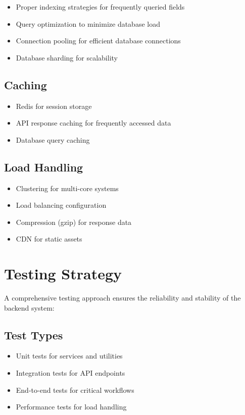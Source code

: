 \begin{itemize}
    \item Proper indexing strategies for frequently queried fields
    \item Query optimization to minimize database load
    \item Connection pooling for efficient database connections
    \item Database sharding for scalability
\end{itemize}

\subsection{Caching}

\begin{itemize}
    \item Redis for session storage
    \item API response caching for frequently accessed data
    \item Database query caching
\end{itemize}

\subsection{Load Handling}

\begin{itemize}
    \item Clustering for multi-core systems
    \item Load balancing configuration
    \item Compression (gzip) for response data
    \item CDN for static assets
\end{itemize}

\section{Testing Strategy}

A comprehensive testing approach ensures the reliability and stability of the backend system:

\subsection{Test Types}

\begin{itemize}
    \item Unit tests for services and utilities
    \item Integration tests for API endpoints
    \item End-to-end tests for critical workflows
    \item Performance tests for load handling
\end{itemize}

